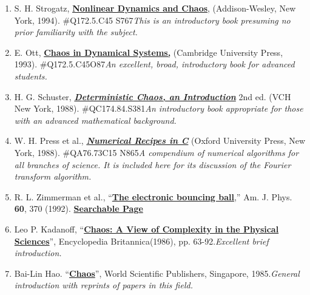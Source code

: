 \documentclass{../lab}
\begin{document}
\begin{enumerate}
    \item S. H. Strogatz, \href{http://physics111.lib.berkeley.edu/Physics111/Reprints/NLD/Strogatz\_Nonlinear\_dynamics\_chaos.pdf}{\textbf{Nonlinear Dynamics and Chaos}}, (Addison-Wesley, New York, 1994). \#Q172.5.C45 S767\emph{This is an introductory book presuming no prior familiarity with the subject.}

    \item E. Ott, \href{http://ebooks.cambridge.org/ebook.jsf?bid=CBO9780511803260}{\textbf{Chaos in Dynamical Systems,}} (Cambridge University Press, 1993). \#Q172.5.C45O87\emph{An excellent, broad, introductory book for advanced students.}

    \item H. G. Schuster, \emph{\href{http://physics111.lib.berkeley.edu/Physics111/Reprints/NLD/13-Shannons\_Measure\_of\_Information.pdf}{\textbf{Deterministic Chaos, an Introduction}}} 2nd ed. (VCH New York, 1988). \#QC174.84.S381\emph{An introductory book appropriate for those with an advanced mathematical background.}

    \item W. H. Press et al., \emph{\href{http://physics111.lib.berkeley.edu/Physics111/Reprints/NLD/11-Fourier\_Transform\_Spectral\_Methods.pdf}{\textbf{Numerical Recipes in C}}} (Oxford University Press, New York, 1988). \#QA76.73C15 N865\emph{A compendium of numerical algorithms for all branches of science. It is included here for its discussion of the Fourier transform algorithm.}

    \item R. L. Zimmerman et al., ``\href{http://ajp.aapt.org/resource/1/ajpias/v60/i4/p370\_s1}{\textbf{The electronic bouncing ball}},'' Am. J. Phys. \textbf{60}, 370 (1992). \href{http://physics111.lib.berkeley.edu/Physics111/Reprints/NLD/14-Electronic\_Bouncing\_Ball.pdf}{\textbf{Searchable Page}}

    \item Leo P. Kadanoff, ``\href{http://physics111.lib.berkeley.edu/Physics111/Reprints/NLD/01-Chaos-A\_View\_of\_Complexity.pdf}{\textbf{Chaos: A View of Complexity in the Physical Sciences}}'', Encyclopedia Britannica(1986), pp. 63-92.\emph{Excellent brief introduction.}

    \item Bai-Lin Hao. ``\href{http://physics111.lib.berkeley.edu/Physics111/Reprints/NLD/02-Chaos.pdf}{\textbf{Chaos}}'', World Scientific Publishers, Singapore, 1985.\emph{General introduction with reprints of papers in this field.}


\end{enumerate}
\end{document}
